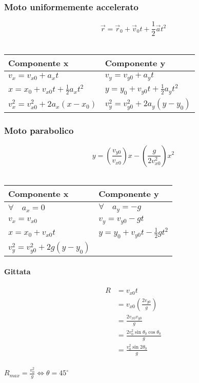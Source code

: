 \documentclass[a4paper,12pt]{article}
\theoremstyle{mystyle}
\begin{document}
\subsubsection{Moto uniformemente accelerato}
\[\vec r = \vec r_0 + \vec v_0 t + \frac{1}{2} \vec a t^2\]\\

\begin{table}[h]
    \centering
    \begin{tabular}{|l|l|}
    \hline
    \textbf{Componente x} & \textbf{Componente y} \\
    \hline
    \( v_x = v_{x0} + a_x t \) & \( v_y = v_{y0} + a_y t \) \\
    \( x = x_0 + v_{x0} t + \frac{1}{2} a_x t^2 \) & \( y = y_0 + v_{y0} t + \frac{1}{2} a_y t^2 \) \\
    \( v_x^2 = v_{x0}^2 + 2a_x (x - x_0) \) & \( v_y^2 = v_{y0}^2 + 2a_y (y - y_0) \) \\
    \hline
    \end{tabular}
\end{table}

\subsubsection{Moto parabolico}
\[y= \left( \frac{v_{y0}}{v_{x0}}\right)x-\left( \frac{g}{2v_{x0}^2}\right)x^2\]\\

\begin{table}[h]
    \centering
    \begin{tabular}{|l|l|}
    \hline
    \textbf{Componente x } & \textbf{Componente y } \\
    \hline 
    \(\forall \quad a_x=0\) & \(\forall \quad a_y=-g\) \\
    \( v_x = v_{x0} \) & \( v_y = v_{y0} - gt \) \\
    \( x = x_0 + v_{x0} t \) & \( y = y_0 + v_{y0} t - \frac{1}{2} g t^2 \) \\
    \( v_y^2 = v_{y0}^2 + 2g (y - y_0) \) & \\
    \hline
    \end{tabular}
\end{table}

\paragraph{Gittata}
\[
\begin{aligned}
    R &= v_{x0}t \\
    &= v_{x0} \left(\frac{2v_{y0}}{g}\right) \\
    &= \frac{2v_{x0}v_{y0}}{g} \\
    &= \frac{2v_0^2 \sin \theta_0 \cos \theta_0}{g} \\
    &= \frac{v_0^2 \sin 2 \theta_0}{g}
\end{aligned}
\]
\\
\(R_{max} = \frac{v_0^2}{g} \Leftrightarrow \theta = 45^\circ\)
\end{document}

